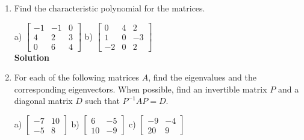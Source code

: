 \begin{enumerate}
\item Find the characteristic polynomial for the matrices.

a) $\left [ \begin{array}{rrr}
                -1&-1&0\\4&2&3\\0&6&4\end{array} \right ]$
\quad b) $\left [ \begin{array}{rrr}
                0&4&2\\1&0&-3\\-2&0&2\end{array} \right ]$\\
                
\noindent \textbf{Solution} 

\item For each of the following matrices $A$, find the eigenvalues
and the corresponding eigenvectors. When possible, find an
invertible matrix $P$ and a diagonal matrix $D$ such that
$P^{-1}AP=D$.

a) $\left[ \begin{array}{rr} -7&10\\ -5&8\end{array} \right]$
\quad b) $\left[ \begin{array}{rr} 6&-5\\ 10&-9\end{array}
\right]$ \quad c) $\left[ \begin{array}{rr} -9&-4\\20&9\end{array}
\right]$


\end{enumerate}
